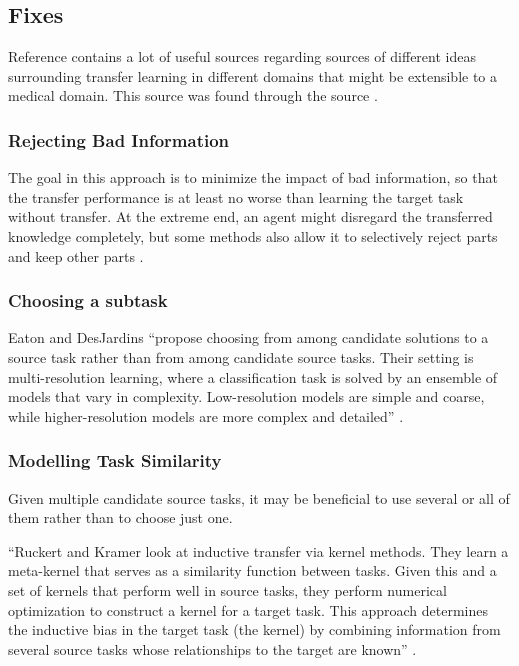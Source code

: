 \documentclass[11pt]{article}
\begin{document}
\subsection{Fixes}

Reference \cite{torrey-handbook} contains a lot of useful sources regarding sources of different ideas surrounding transfer learning in different domains that might be extensible to a medical domain. This source was found through the source \cite{ gentle-introduction-to-transfer-learning}.

\subsubsection{Rejecting Bad Information}

The goal in this approach is to minimize the impact of bad information, so that the transfer performance is at least no worse than learning the target task without transfer. At the extreme end, an agent might disregard the transferred knowledge completely, but some methods also allow it to selectively reject parts and keep other parts \cite{torrey-handbook}.

\subsubsection{Choosing a subtask}

Eaton and DesJardins ``propose choosing from among candidate solutions to a source task rather than from among candidate source tasks. Their setting is multi-resolution learning, where a classification task is solved by an ensemble of models that vary in complexity. Low-resolution models are simple and coarse, while higher-resolution models are more complex and detailed'' \cite{torrey-handbook}.

\subsubsection{Modelling Task Similarity}

Given multiple candidate source tasks, it may be beneficial to use several or all of them rather than to choose just one.

``Ruckert and Kramer look at inductive transfer via kernel methods. They learn a meta-kernel that serves as a similarity function between tasks. Given this and a set of kernels that perform well in source tasks, they perform numerical optimization to construct a kernel for a target task. This approach determines the inductive bias in the target task (the kernel) by combining information from several source tasks whose relationships to the target are known'' \cite{torrey-handbook}.
\end{document}

